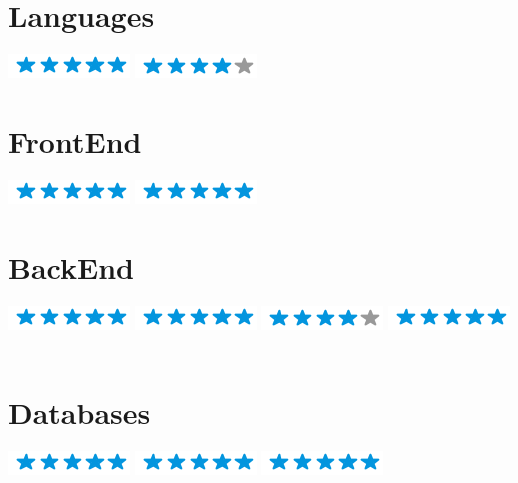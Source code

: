 \documentclass[american]{cv-class}
\begin{document}
\begin{aside}
	\section{Languages}
	{\includegraphics[scale=0.40]{img/5stars.png}}
	{\includegraphics[scale=0.40]{img/4stars.png}}
	~
	\section{FrontEnd}
	{\includegraphics[scale=0.40]{img/5stars.png}}
	{\includegraphics[scale=0.40]{img/5stars.png}}
	~
	\section{BackEnd}
	{\includegraphics[scale=0.40]{img/5stars.png}}
	{\includegraphics[scale=0.40]{img/5stars.png}}
	{\includegraphics[scale=0.40]{img/4stars.png}}
	{\includegraphics[scale=0.40]{img/5stars.png}}
	~
	\section{Databases}
	{\includegraphics[scale=0.40]{img/5stars.png}}
	{\includegraphics[scale=0.40]{img/5stars.png}}
	{\includegraphics[scale=0.40]{img/5stars.png}}
	
\end{aside}
\end{document}
